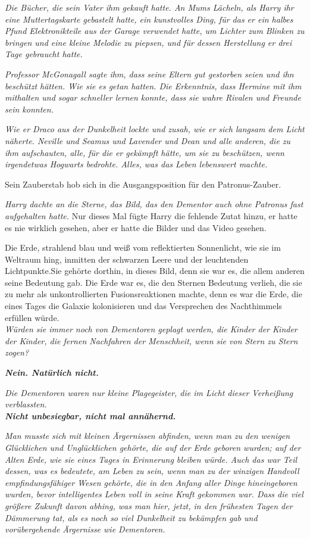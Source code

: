 {\emph{Die Bücher, die sein Vater ihm gekauft hatte. An Mums Lächeln, als Harry ihr eine Muttertagskarte gebastelt hatte, ein kunstvolles Ding, für das er ein halbes Pfund Elektronikteile aus der Garage verwendet hatte, um Lichter zum Blinken zu bringen und eine kleine Melodie zu piepsen, und für dessen Herstellung er drei Tage gebraucht hatte.}

\emph{Professor McGonagall sagte ihm, dass seine Eltern gut gestorben seien und ihn beschützt hätten. Wie sie es getan hatten. Die Erkenntnis, dass Hermine mit ihm mithalten und sogar schneller lernen konnte, dass sie wahre Rivalen und Freunde sein konnten.}

\emph{Wie er Draco aus der Dunkelheit lockte und zusah, wie er sich langsam dem Licht näherte. Neville und Seamus und Lavender und Dean und alle anderen, die zu ihm aufschauten, alle, für die er gekämpft hätte, um sie zu beschützen, wenn irgendetwas Hogwarts bedrohte. Alles, was das Leben lebenswert machte.}

Sein Zauberstab hob sich in die Ausgangsposition für den Patronus-Zauber.

\emph{Harry dachte an die Sterne, das Bild, das den Dementor auch ohne Patronus fast aufgehalten hatte.} Nur dieses Mal fügte Harry die fehlende Zutat hinzu, er hatte es nie wirklich gesehen, aber er hatte die Bilder und das Video gesehen.

Die Erde, strahlend blau und weiß vom reflektierten Sonnenlicht, wie sie im Weltraum hing, inmitten der schwarzen Leere und der leuchtenden Lichtpunkte.Sie gehörte dorthin, in dieses Bild, denn sie war es, die allem anderen seine Bedeutung gab. Die Erde war es, die den Sternen Bedeutung verlieh, die sie zu mehr als unkontrollierten Fusionsreaktionen machte, denn es war die Erde, die eines Tages die Galaxie kolonisieren und das Versprechen des Nachthimmels erfüllen würde.\\

\emph{Würden sie immer noch von Dementoren geplagt werden, die Kinder der Kinder der Kinder, die fernen Nachfahren der Menschheit, wenn sie von Stern zu Stern zogen?}

\emph{\textbf{Nein. Natürlich nicht.}}

\emph{Die Dementoren waren nur kleine Plagegeister, die im Licht dieser Verheißung verblassten.\\ \textbf{Nicht unbesiegbar, nicht mal annähernd.}}

\emph{Man musste sich mit kleinen Ärgernissen abfinden, wenn man zu den wenigen Glücklichen und Unglücklichen gehörte, die auf der Erde geboren wurden; auf der Alten Erde, wie sie eines Tages in Erinnerung bleiben würde. Auch das war Teil dessen, was es bedeutete, am Leben zu sein, wenn man zu der winzigen Handvoll empfindungsfähiger Wesen gehörte, die in den Anfang aller Dinge hineingeboren wurden, bevor intelligentes Leben voll in seine Kraft gekommen war. Dass die viel größere Zukunft davon abhing, was man hier, jetzt, in den frühesten Tagen der Dämmerung tat, als es noch so viel Dunkelheit zu bekämpfen gab und vorübergehende Ärgernisse wie Dementoren.}

}
